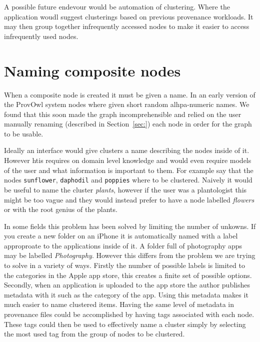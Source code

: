 A possible future endevour would be automation of clustering. Where the application woudl suggest clusterings based on previous provenance workloads. It may then group together infrequently accessed nodes to make it easier to access infrequently used nodes.

\section{Naming composite nodes}
\label{sec:naming_composite_nodes}

When a composite node is created it must be given a name. In an early version of the ProvOwl system nodes where given short random alhpa-numeric names. We found that this soon made the graph incomprehensible and relied on the user manually 
renaming (described in Section~\ref{sec:}) each node in order for the graph to be usable. 

Ideally an interface would give clusters a name describing the nodes inside of it. However htis requires on domain level knowledge and would even require models of the user and what information is important to them. For example say that the nodes \texttt{sunflower}, \texttt{daphodil} and \texttt{poppies} where to be clustered. Naively it would be useful to name the cluster \textit{plants}, however if the user was a plantologist
this might be too vague and they would instead prefer to have a node labelled \textit{flowers} or with the root genius of the plants. 

In some fields this problem has been solved by limiting the number of unkowns. If you create a new folder on an iPhone it is automatically named with a label approproate to the applications inside of it. A folder full of photography apps may be labelled \textit{Photography}. However this differs from the problem we are trying to solve in a variety of ways. Firstly the number of possible labels is limited to the categories in the Apple app store, this creates a finite set of possible options. Secondly, when an application is uploaded to the app store the author publishes metadata with it such as the category of the app. Using this metadata makes it much easier to name clustered items. Having the same level of metadata in provenance files could be accomplished by having tags associated with each node. These tags could then be used to effectively name a cluster simply by selecting the most used tag from the group of nodes to be clustered.

